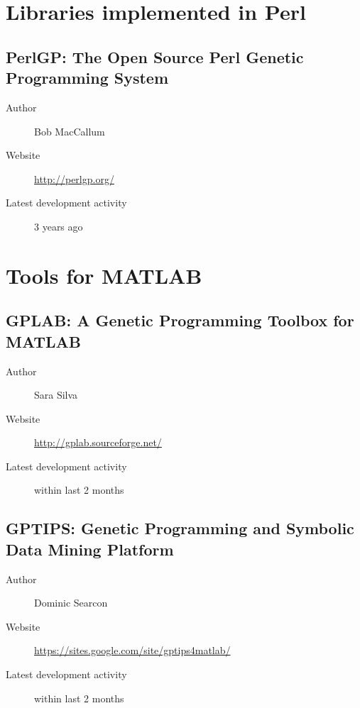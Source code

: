 \section{Libraries implemented in Perl}
\subsection*{PerlGP: The Open Source Perl Genetic Programming System}
\begin{description}
    \item[Author] Bob MacCallum
    \item[Website] \url{http://perlgp.org/}
    \item[Latest development activity] 3 years ago
\end{description}


\section{Tools for MATLAB}
\subsection*{GPLAB: A Genetic Programming Toolbox for MATLAB}
\begin{description}
    \item[Author] Sara Silva
    \item[Website] \url{http://gplab.sourceforge.net/}
    \item[Latest development activity] within last 2 months
\end{description}


\subsection*{GPTIPS: Genetic Programming and Symbolic Data Mining Platform}
\begin{description}
    \item[Author] Dominic Searcon
    \item[Website] \url{https://sites.google.com/site/gptips4matlab/}
    \item[Latest development activity] within last 2 months
\end{description}

